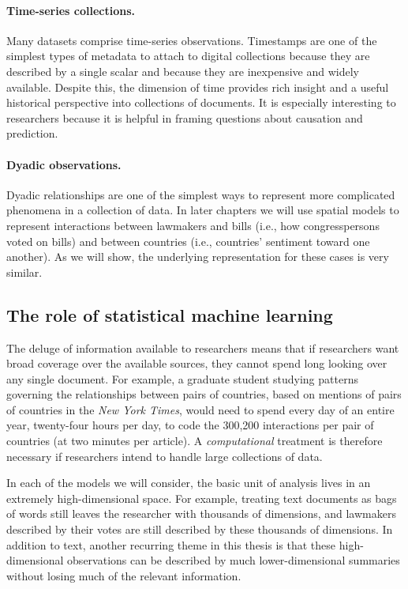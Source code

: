 \paragraph{Time-series collections.}  Many datasets comprise
time-series observations.  Timestamps are one of the simplest types of
metadata to attach to digital collections because they are described
by a single scalar and because they are inexpensive and widely
available.  Despite this, the dimension of time provides rich insight
and a useful historical perspective into collections of documents.  It
is especially interesting to researchers because it is helpful in
framing questions about causation and prediction.

\paragraph{Dyadic observations.}  Dyadic relationships are one of the
simplest ways to represent more complicated phenomena in a collection
of data. In later chapters we will use spatial models to represent
interactions between lawmakers and bills (i.e., how congresspersons voted
on bills) and between countries (i.e., countries' sentiment
toward one another).  As we will show, the underlying representation
for these cases is very similar.

\subsection*{The role of statistical machine learning}

The deluge of information available to researchers means that if
researchers want broad coverage over the available sources, they
cannot spend long looking over any single document.  For example, a
graduate student studying patterns governing the relationships between
pairs of countries, based on mentions of pairs of countries in the
\emph{New York Times}, would need to spend every day of an entire
year, twenty-four hours per day, to code the 300,200 interactions per
pair of countries (at two minutes per article).  A
\emph{computational} treatment is therefore necessary if researchers
intend to handle large collections of data.

In each of the models we will consider, the basic unit of analysis
lives in an extremely high-dimensional space.  For example, treating
text documents as bags of words still leaves the researcher with
thousands of dimensions, and lawmakers described by their votes are
still described by these thousands of dimensions.  In addition to
text, another recurring theme in this thesis is that these
high-dimensional observations can be described by much
lower-dimensional summaries without losing much of the relevant
information.

